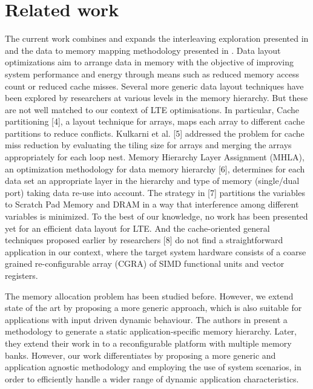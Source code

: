 \documentclass[prodmode,acmtodaes]{acmsmall}
\begin{document}
\section{Related work}
\label{sec:related}

The current work combines and expands the interleaving exploration presented in \cite{sharma2013data} and the data to memory mapping methodology presented in \cite{filippopoulos2013exploration}. Data layout optimizations aim to arrange data in memory with the objective of improving system performance and energy through means such as reduced memory access count or reduced cache misses. Several more generic data layout techniques have been explored by researchers at various levels in the memory hierarchy. But these are not well matched to our context of LTE optimisations. In particular, Cache partitioning [4], a layout technique for arrays, maps each array to different cache partitions to reduce conflicts. Kulkarni et al. [5] addressed the problem for cache miss reduction by evaluating the tiling size for arrays and merging the arrays appropriately for each loop nest. Memory Hierarchy Layer Assignment (MHLA), an optimization methodology for data memory hierarchy [6], determines for each data set an appropriate layer in the hierarchy and type of memory (single/dual port) taking data re-use into account. The strategy in [7] partitions the variables to Scratch Pad Memory and DRAM in a way that interference among different variables is minimized. To the best of our knowledge, no work has been presented yet for an efficient data layout for LTE. And the cache-oriented general techniques proposed earlier by researchers [8] do not find a straightforward application in our context, where the target system hardware consists of a coarse grained re-configurable array (CGRA) of SIMD functional units and vector registers.

The memory allocation problem has been studied before. 
However, we extend state of the art by proposing a more generic approach, which is also suitable for applications with input driven dynamic behaviour. 
The authors in \cite{Ben00b} present a methodology to generate a static application-specific memory hierarchy. 
Later, they extend their work in \cite{Ben00c} to a reconfigurable platform with multiple memory banks. 
However, our work differentiates by proposing a more generic and application agnostic methodology and employing the use of system scenarios, in order to efficiently handle a wider range of dynamic application characteristics. 
\end{document}

